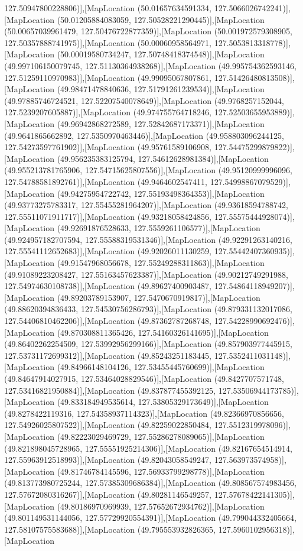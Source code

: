 127.50947800228806)],[MapLocation (50.01657634591334, 127.5066026742241)],[MapLocation (50.01205884083059, 127.50528221290445)],[MapLocation (50.00657039961479, 127.50476722877359)],[MapLocation (50.001972579308905, 127.50357888741975)],[MapLocation (50.00060958564971, 127.5053813318778)],[MapLocation (50.00019580734247, 127.50748418374548)],[MapLocation (49.997106150079745, 127.51130364938268)],[MapLocation (49.995754362593146, 127.51259110970983)],[MapLocation (49.99095067807861, 127.51426480813508)],[MapLocation (49.98471478840636, 127.51791261239534)],[MapLocation (49.97885746724521, 127.52207540078649)],[MapLocation (49.9768257152044, 127.5239207605887)],[MapLocation (49.974755764718246, 127.52503655953889)],[MapLocation (49.96942868272589, 127.52842687173371)],[MapLocation (49.9641865662892, 127.5350970463446)],[MapLocation (49.958803096244125, 127.54273597761902)],[MapLocation (49.95761589106908, 127.54475299879822)],[MapLocation (49.956235383125794, 127.54612628981384)],[MapLocation (49.955213781765906, 127.54715625807556)],[MapLocation (49.95120999996096, 127.54788581892761)],[MapLocation (49.9464602547411, 127.54998867079529)],[MapLocation (49.94275954722742, 127.55193498364353)],[MapLocation (49.93773275783317, 127.55455281964207)],[MapLocation (49.93618594788742, 127.55511071911717)],[MapLocation (49.93218058424856, 127.55575444928074)],[MapLocation (49.92691876528633, 127.5559261106577)],[MapLocation (49.924957182707594, 127.55588319531346)],[MapLocation (49.92291263140216, 127.55541112652683)],[MapLocation (49.92026011130259, 127.55442407360935)],[MapLocation (49.91547968056678, 127.55249288311863)],[MapLocation (49.91089223208427, 127.55163457623387)],[MapLocation (49.90212749291988, 127.54974630108738)],[MapLocation (49.89627400903487, 127.54864118949207)],[MapLocation (49.89203789153907, 127.5470670919817)],[MapLocation (49.88620394836433, 127.54530756286793)],[MapLocation (49.879331132017086, 127.54406810462206)],[MapLocation (49.87362787268748, 127.54228990692476)],[MapLocation (49.870308811365426, 127.54160326141695)],[MapLocation (49.86402262254509, 127.53992956299166)],[MapLocation (49.857903977445915, 127.53731172699312)],[MapLocation (49.85243251183445, 127.5352411031148)],[MapLocation (49.84966148104126, 127.53455445760699)],[MapLocation (49.84647914027915, 127.53464028829546)],[MapLocation (49.8427707571748, 127.53416821950884)],[MapLocation (49.837877455392125, 127.53506944173785)],[MapLocation (49.833184949535614, 127.53805329173649)],[MapLocation (49.8278422119316, 127.54358937114323)],[MapLocation (49.82366970856656, 127.54926025807522)],[MapLocation (49.82259022850484, 127.5512319978096)],[MapLocation (49.82223029469729, 127.55286278089065)],[MapLocation (49.821898045728965, 127.55551925214306)],[MapLocation (49.82167654514914, 127.55963912518993)],[MapLocation (49.82043058549247, 127.563973574958)],[MapLocation (49.81746784145596, 127.56933799298778)],[MapLocation (49.813773980725244, 127.57385309686384)],[MapLocation (49.808567574983456, 127.57672080316267)],[MapLocation (49.80281146549257, 127.57678422141305)],[MapLocation (49.80186970969939, 127.57652672934762)],[MapLocation (49.801149531144056, 127.57729920554391)],[MapLocation (49.799044332405664, 127.58107575583688)],[MapLocation (49.795553932826365, 127.5960102956318)],[MapLocation 